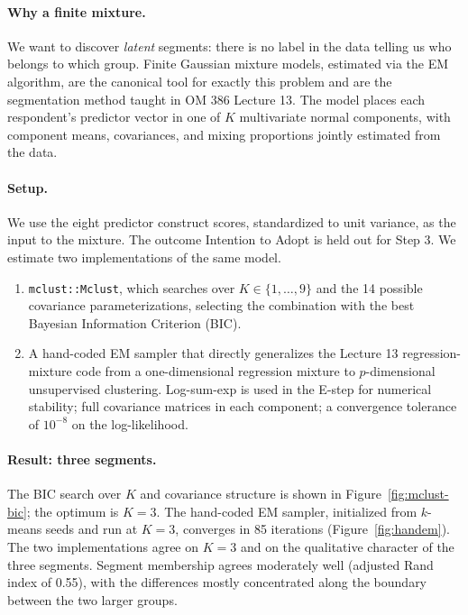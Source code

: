 \documentclass[11pt]{article}
\begin{document}
\paragraph{Why a finite mixture.} We want to discover \emph{latent}
segments: there is no label in the data telling us who belongs to
which group. Finite Gaussian mixture models, estimated via the EM
algorithm, are the canonical tool for exactly this problem and are
the segmentation method taught in OM 386 Lecture 13. The model
places each respondent's predictor vector in one of $K$ multivariate
normal components, with component means, covariances, and mixing
proportions jointly estimated from the data.

\paragraph{Setup.} We use the eight predictor construct scores,
standardized to unit variance, as the input to the mixture. The
outcome Intention to Adopt is held out for Step 3. We estimate two
implementations of the same model.

\begin{enumerate}
  \item \texttt{mclust::Mclust}, which searches over
        $K \in \{1, \dots, 9\}$ and the 14 possible covariance
        parameterizations, selecting the combination with the best
        Bayesian Information Criterion (BIC).
  \item A hand-coded EM sampler that directly generalizes the
        Lecture 13 regression-mixture code from a one-dimensional
        regression mixture to $p$-dimensional unsupervised
        clustering. Log-sum-exp is used in the E-step for numerical
        stability; full covariance matrices in each component; a
        convergence tolerance of $10^{-8}$ on the log-likelihood.
\end{enumerate}

\paragraph{Result: three segments.} The BIC search over $K$ and
covariance structure is shown in Figure~\ref{fig:mclust-bic}; the
optimum is $K = 3$. The hand-coded EM sampler, initialized from
$k$-means seeds and run at $K = 3$, converges in 85 iterations
(Figure~\ref{fig:handem}). The two implementations agree on $K = 3$
and on the qualitative character of the three segments. Segment
membership agrees moderately well (adjusted Rand index of 0.55),
with the differences mostly concentrated along the boundary between
the two larger groups.
\end{document}
